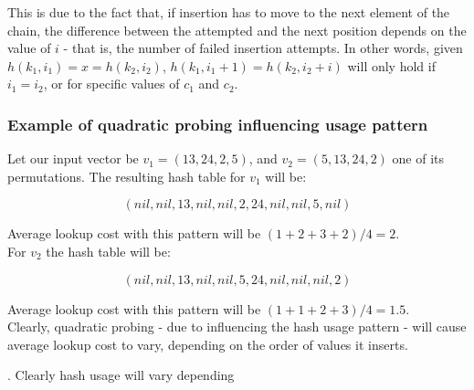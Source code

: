 \documentclass[a4paper]{scrartcl}
\begin{document}
This is due to the fact that, if insertion has to move to the next element of
the chain, the difference between the attempted and the next position depends
on the value of $i$ - that is, the number of failed insertion attempts.  In
other words, given $h(k_1, i_1) = x = h(k_2, i_2)$, $h(k_1, i_1 + 1) = h(k_2,
i_2 + i)$ will only hold if $i_1 = i_2$, or for specific values of $c_1$ and
$c_2$.

\subsubsection{Example of quadratic probing influencing usage pattern}

Let our input vector be $v_1 = (13, 24, 2, 5)$, and $v_2 = (5, 13, 24, 2)$ one
of its permutations. The resulting hash table for $v_1$ will be:

\[
	(nil, nil, 13, nil, nil, 2, 24, nil, nil, 5, nil)
\]

Average lookup cost with this pattern will be $(1 + 2 + 3 + 2) / 4 = 2$.
\\

For $v_2$ the hash table will be:

\[
	(nil, nil, 13, nil, nil, 5, 24, nil, nil, nil, 2)
\]

Average lookup cost with this pattern will be $(1 + 1 + 2 + 3) / 4 = 1.5$.
\\

Clearly, quadratic probing - due to influencing the hash usage pattern - will
cause average lookup cost to vary, depending on the order of values it inserts.

. Clearly hash usage will vary depending 
\end{document}
